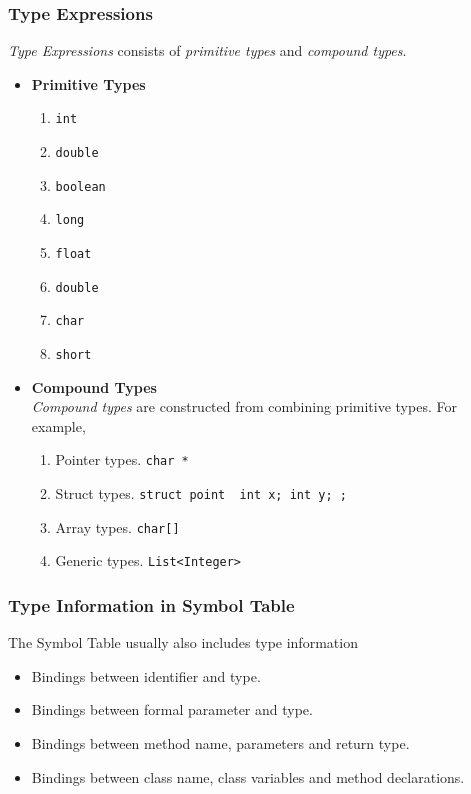 \subsubsection{Type Expressions}

\textit{Type Expressions} consists of \textit{primitive types} and \textit{compound types}.
\begin{itemize}
    \item \textbf{Primitive Types}
    \begin{enumerate}
        \item \texttt{int}
        \item \texttt{double}
        \item \texttt{boolean}
        \item \texttt{long}
        \item \texttt{float}
        \item \texttt{double}
        \item \texttt{char}
        \item \texttt{short}
    \end{enumerate}
    \item \textbf{Compound Types} \\
        \textit{Compound types} are constructed from combining primitive types. For example,
        \begin{enumerate}
            \item Pointer types. \texttt{char *}
            \item Struct types. \texttt{struct point { int x; int y; };}
            \item Array types. \texttt{char[]}
            \item Generic types. \texttt{List<Integer>}
        \end{enumerate}
\end{itemize}

\subsubsection{Type Information in Symbol Table}

The Symbol Table usually also includes type information
\begin{itemize}
    \item Bindings between identifier and type.
    \item Bindings between formal parameter and type.
    \item Bindings between method name, parameters and return type.
    \item Bindings between class name, class variables and method declarations.
\end{itemize}

